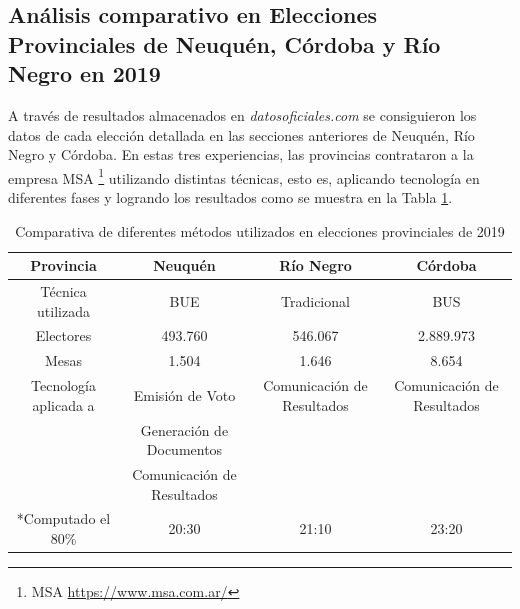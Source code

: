 \subsection{Análisis comparativo en Elecciones Provinciales de Neuquén, Córdoba y Río Negro en 2019}
\label{analisisComparativoProvincial}
A través de resultados almacenados en \textit{datosoficiales.com} se consiguieron los datos de cada elección detallada en las secciones anteriores de Neuquén, Río Negro y Córdoba.   \newline
En estas tres experiencias, las provincias contrataron a la empresa MSA \footnote{MSA \url{https://www.msa.com.ar/}} utilizando distintas técnicas, esto es, aplicando tecnología en diferentes fases y logrando los resultados como se muestra en la Tabla \ref{tab:comparativa}.
\begin{table}[]
    \centering
    \begin{tabular}{c|c|c|c}
         Provincia & Neuquén& Río Negro & Córdoba   \\
         \hline
         Técnica utilizada& BUE & Tradicional & BUS \\
         \hline
         Electores& 493.760 & 546.067 & 2.889.973 \\
         \hline
         Mesas& 1.504 & 1.646 & 8.654\\
         \hline
         Tecnología aplicada a& Emisión de Voto &Comunicación de Resultados & Comunicación de Resultados \\
         & Generación de Documentos & & \\
         & Comunicación de Resultados & & \\
         \hline
         *Computado el 80\% & 20:30 & 21:10 & 23:20\\
         \hline
    \end{tabular}
    \caption{Comparativa de diferentes métodos utilizados en elecciones provinciales de 2019}
    \label{tab:comparativa}
\end{table}


